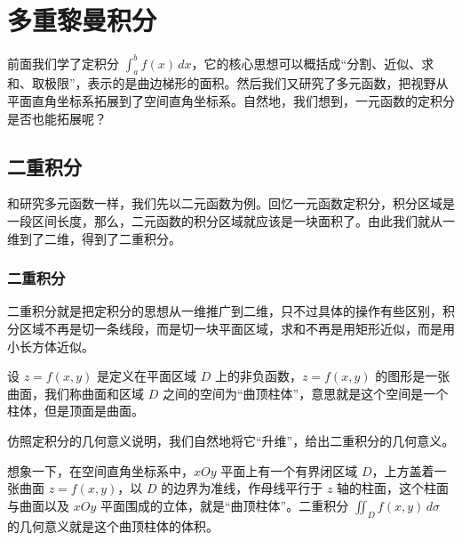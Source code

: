 \chapter{多重黎曼积分}
前面我们学了定积分 $\int_a^b f(x)\,dx$，它的核心思想可以概括成“分割、近似、求和、取极限”，表示的是曲边梯形的面积。然后我们又研究了多元函数，把视野从平面直角坐标系拓展到了空间直角坐标系。自然地，我们想到，一元函数的定积分是否也能拓展呢？
\section{二重积分}
和研究多元函数一样，我们先以二元函数为例。回忆一元函数定积分，积分区域是一段区间长度，那么，二元函数的积分区域就应该是一块面积了。由此我们就从一维到了二维，得到了二重积分。
\subsection{二重积分}
二重积分就是把定积分的思想从一维推广到二维，只不过具体的操作有些区别，积分区域不再是切一条线段，而是切一块平面区域，求和不再是用矩形近似，而是用小长方体近似。

设 $z = f(x, y)$ 是定义在平面区域 $D$ 上的非负函数，$z = f(x, y)$ 的图形是一张曲面，我们称曲面和区域 $D$ 之间的空间为“曲顶柱体”，意思就是这个空间是一个柱体，但是顶面是曲面。

仿照定积分的几何意义说明，我们自然地将它“升维”，给出二重积分的几何意义。

想象一下，在空间直角坐标系中，\(xOy\) 平面上有一个有界闭区域 \(D\)，上方盖着一张曲面 \(z = f(x,y)\)，以 \(D\) 的边界为准线，作母线平行于 \(z\) 轴的柱面，这个柱面与曲面以及 \(xOy\) 平面围成的立体，就是“曲顶柱体”。二重积分 \(\iint_D f(x,y)\,d\sigma\) 的几何意义就是这个曲顶柱体的体积。

